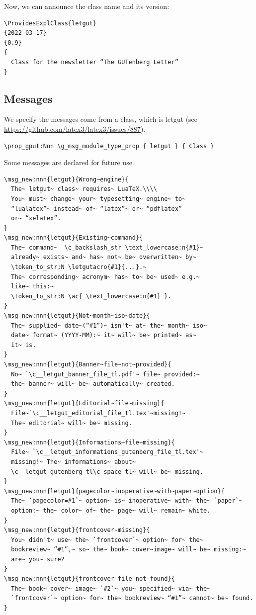 \documentclass{letgut}
\begin{document}
Now, we can announce the class name and its version:

\begin{lstlisting}
\ProvidesExplClass{letgut}
{2022-03-17}
{0.9}
{
  Class for the newsletter “The GUTenberg Letter”
}
\end{lstlisting}

\subsection{Messages}
\label{sec:org447090b}

We specify the messages come from a class, which is letgut (see
\url{https://github.com/latex3/latex3/issues/887}).

\begin{lstlisting}
\prop_gput:Nnn \g_msg_module_type_prop { letgut } { Class }
\end{lstlisting}

Some messages are declared for future use.

\begin{lstlisting}
\msg_new:nnn{letgut}{Wrong~engine}{
  The~ letgut~ class~ requires~ LuaTeX.\\\\
  You~ must~ change~ your~ typesetting~ engine~ to~
  “lualatex”~ instead~ of~ “latex”~ or~ “pdflatex”
  or~ “xelatex”.
}
\msg_new:nnn{letgut}{Existing~command}{
  The~ command~  \c_backslash_str \text_lowercase:n{#1}~
  already~ exists~ and~ has~ not~ be~ overwritten~ by~
  \token_to_str:N \letgutacro{#1}{...}.~
  The~ corresponding~ acronym~ has~ to~ be~ used~ e.g.~
  like~ this:~
  \token_to_str:N \ac{ \text_lowercase:n{#1} }.
}
\msg_new:nnn{letgut}{Not~month~iso~date}{
  The~ supplied~ date~(“#1”)~ isn't~ at~ the~ month~ iso~
  date~ format~ (YYYY-MM):~ it~ will~ be~ printed~ as~
  it~ is.
}
\msg_new:nnn{letgut}{Banner~file~not~provided}{
  No~ `\c__letgut_banner_file_tl.pdf'~ file~ provided:~
  the~ banner~ will~ be~ automatically~ created.
}
\msg_new:nnn{letgut}{Editorial~file~missing}{
  File~`\c__letgut_editorial_file_tl.tex'~missing!~
  The~ editorial~ will~ be~ missing.
}
\msg_new:nnn{letgut}{Informations~file~missing}{
  File~ `\c__letgut_informations_gutenberg_file_tl.tex'~
  missing!~ The~ informations~ about~
  \c__letgut_gutenberg_tl\c_space_tl~ will~ be~ missing.
}
\msg_new:nnn{letgut}{pagecolor~inoperative~with~paper~option}{
  The~ `pagecolor=#1`~ option~ is~ inoperative~ with~ the~ `paper`~
  option:~ the~ color~ of~ the~ page~ will~ remain~ white.
}
\msg_new:nnn{letgut}{frontcover-missing}{
  You~ didn't~ use~ the~ `frontcover`~ option~ for~ the~
  bookreview~ “#1”,~ so~ the~ book~ cover~image~ will~ be~ missing:~
  are~ you~ sure?
}
\msg_new:nnn{letgut}{frontcover-file-not-found}{
  The~ book~ cover~ image~ `#2`~ you~ specified~ via~ the~
  `frontcover`~ option~ for~ the~ bookreview~ “#1”~ cannot~ be~ found.
}
\end{lstlisting}
\end{document}
